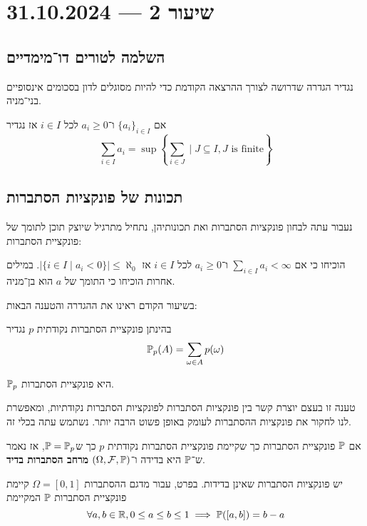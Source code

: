 \section{שיעור 2 --- 31.10.2024}
\subsection{השלמה לטורים דו־מימדיים}
נגדיר הגדרה שדרושה לצורך ההרצאה הקודמת כדי להיות מסוגלים לדון בסכומים אינסופיים בני־מניה.
\begin{definition}
	אם ${\{a_i\}}_{i \in I}$ ו־$a_i \ge 0$ לכל $i \in I$ אז נגדיר
	\[
		\sum_{i \in I} a_i = \sup \left\{ \sum_{i \in J} \mid J \subseteq I, J \text{ is finite} \right\}
	\]
\end{definition}

\subsection{תכונות של פונקציות הסתברות}
נעבור עתה לבחון פונקציות הסתברות ואת תכונותיהן, נתחיל מתרגיל שיוצק תוכן לתומך של פונקציית הסתברות:
\begin{exercise}
	הוכיחו כי אם $\sum_{i \in I} a_i < \infty$ ו־$a_i \ge 0$ לכל $i \in I$ אז $|\{ i \in I \mid a_i < 0 \}| \le \aleph_0$.
	במילים אחרות הוכיחו כי התומך של $a$ הוא בן־מניה.
\end{exercise}
בשיעור הקודם ראינו את ההגדרה והטענה הבאות:
\begin{definition}
	בהינתן פונקציית הסתברות נקודתית $p$ נגדיר
	\[
		\mathbb{P}_p(A) = \sum_{\omega \in A} p(\omega)
	\]
\end{definition}
\begin{proposition}
	$\mathbb{P}_p$ היא פונקציית הסתברות.
\end{proposition}
טענה זו בעצם יוצרת קשר בין פונקציות הסתברות לפונקציות הסתברות נקודתיות, ומאפשרת לנו לחקור את פונקציות ההסתברות לעומק באופן פשוט הרבה יותר. נשתמש עתה בכלי זה.
\begin{definition}
	אם $\mathbb{P}$ פונקציית הסתברות כך שקיימת פונקציית הסתברות נקודתית $p$ כך ש$\mathbb{P} = \mathbb{P}_p$, אז נאמר ש־$\mathbb{P}$ היא בדידה ו־$(\Omega, \mathcal{F}, \mathbb{P})$ \textbf{מרחב הסתברות בדיד}.
\end{definition}
\begin{proposition}
	יש פונקציות הסתברות שאינן בדידות.
	בפרט, עבור מדגם ההסתברות $\Omega = [0, 1]$ קיימת פונקציית הסתברות $\mathbb{P}$ המקיימת
	\[
		\forall a, b \in \mathbb{R}, 0 \le a \le b \le 1 \implies \mathbb{P}([a, b]) = b - a
	\]
\end{proposition}
